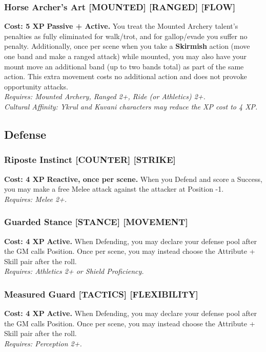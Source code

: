 \subsubsection*{Horse Archer's Art \textnormal{[MOUNTED] [RANGED] [FLOW]}}
\label{talent:horse-archers-art}
\textbf{Cost: 5 XP} \textbf{Passive + Active.} You treat the Mounted Archery talent's penalties as fully eliminated for walk/trot, and for gallop/evade you suffer no penalty. Additionally, once per scene when you take a \textbf{Skirmish} action (move one band and make a ranged attack) while mounted, you may also have your mount move an additional band (up to two bands total) as part of the same action. This extra movement costs no additional action and does not provoke opportunity attacks. \\
\textit{Requires: Mounted Archery, Ranged 2+, Ride (or Athletics) 2+.} \\
\textit{Cultural Affinity: Ykrul and Kuvani characters may reduce the XP cost to 4 XP.}

\subsection*{Defense}
\label{sec:major-defense}

\subsubsection*{Riposte Instinct \textnormal{[COUNTER] [STRIKE]}}
\label{talent:riposte-instinct}
\textbf{Cost: 4 XP} \textbf{Reactive, once per scene.} When you Defend and score a Success, you may make a free Melee attack against the attacker at Position -1. \\
\textit{Requires: Melee 2+.}

\subsubsection*{Guarded Stance \textnormal{[STANCE] [MOVEMENT]}}
\label{talent:guarded-stance}
\textbf{Cost: 4 XP} \textbf{Active.} When Defending, you may declare your defense pool after the GM calls Position. Once per scene, you may instead choose the Attribute + Skill pair after the roll. \\
\textit{Requires: Athletics 2+ or Shield Proficiency.}

\subsubsection*{Measured Guard \textnormal{[TACTICS] [FLEXIBILITY]}}
\label{talent:measured-guard}
\textbf{Cost: 4 XP} \textbf{Active.} When Defending, you may declare your defense pool after the GM calls Position. Once per scene, you may instead choose the Attribute + Skill pair after the roll. \\
\textit{Requires: Perception 2+.}

